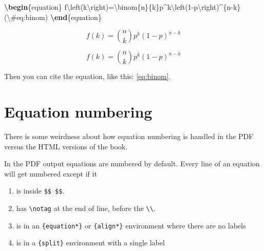 \documentclass[
]{book}
\newenvironment{Shaded}{\begin{snugshade}}{\end{snugshade}}
\newcommand{\ExtensionTok}[1]{#1}
\newcommand{\KeywordTok}[1]{\textcolor[rgb]{0.13,0.29,0.53}{\textbf{#1}}}
\newcommand{\NormalTok}[1]{#1}
\newcommand{\SpecialCharTok}[1]{\textcolor[rgb]{0.00,0.00,0.00}{#1}}
\newcommand{\SpecialStringTok}[1]{\textcolor[rgb]{0.31,0.60,0.02}{#1}}
\providecommand{\tightlist}{%
  \setlength{\itemsep}{0pt}\setlength{\parskip}{0pt}}
\begin{document}
\begin{Shaded}
\begin{Highlighting}[]
\KeywordTok{\textbackslash{}begin}\NormalTok{\{}\ExtensionTok{equation}\NormalTok{\}}
\SpecialStringTok{f}\SpecialCharTok{\textbackslash{}left}\SpecialStringTok{(k}\SpecialCharTok{\textbackslash{}right}\SpecialStringTok{)=}\SpecialCharTok{\textbackslash{}binom}\SpecialStringTok{\{n\}\{k\}p\^{}k}\SpecialCharTok{\textbackslash{}left}\SpecialStringTok{(1{-}p}\SpecialCharTok{\textbackslash{}right}\SpecialStringTok{)\^{}\{n{-}k\} (}\SpecialCharTok{\textbackslash{}\#}\SpecialStringTok{eq:binom)}
\KeywordTok{\textbackslash{}end}\NormalTok{\{}\ExtensionTok{equation}\NormalTok{\}}
\end{Highlighting}
\end{Shaded}

\begin{equation}
f\left(k\right)=\binom{n}{k}p^k\left(1-p\right)^{n-k} \label{eq:binom2}
\end{equation}

\[\begin{equation}
f\left(k\right)=\binom{n}{k}p^k\left(1-p\right)^{n-k} \label{eq:binom3}
\end{equation}\]

Then you can cite the equation, like this: \eqref{eq:binom}.

\hypertarget{equation-numbering}{%
\section{Equation numbering}\label{equation-numbering}}

There is some weirdness about how equation numbering is handled in the PDF versus the HTML versions of the book.

In the PDF output equations are numbered by default. Every line of an equation will get numbered except if it

\begin{enumerate}
\def\labelenumi{\arabic{enumi}.}
\tightlist
\item
  is inside \texttt{\$\$\ \$\$}.
\item
  has \texttt{\textbackslash{}notag} at the end of line, before the \texttt{\textbackslash{}\textbackslash{}}.
\item
  is in an \texttt{\{equation*\}} or \texttt{\{align*\}} environment where there are no labels
\item
  is in a \texttt{\{split\}} environment with a single label
\end{enumerate}
\end{document}
